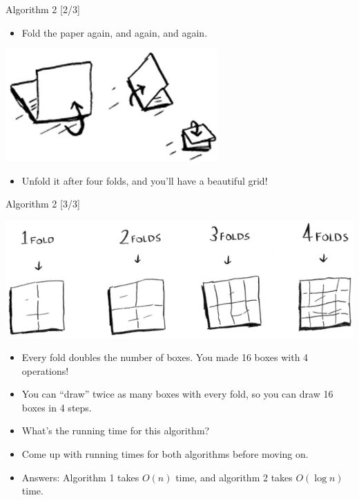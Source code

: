 \documentclass[ignorenonframetext,]{beamer}
\providecommand{\tightlist}{%
  \setlength{\itemsep}{0pt}\setlength{\parskip}{0pt}}
\begin{document}
\begin{frame}{Algorithm 2 {[}2/3{]}}
\protect\hypertarget{algorithm-2-23}{}

\begin{itemize}
\tightlist
\item
  Fold the paper again, and again, and again.
\end{itemize}

\includegraphics{./Chapter01-figure/grid_drawing_04.png}

\begin{itemize}
\tightlist
\item
  Unfold it after four folds, and you'll have a beautiful grid!
\end{itemize}

\end{frame}

\begin{frame}{Algorithm 2 {[}3/3{]}}
\protect\hypertarget{algorithm-2-33}{}

\includegraphics{./Chapter01-figure/grid_drawing_05.png}

\begin{itemize}
\tightlist
\item
  Every fold doubles the number of boxes. You made 16 boxes with 4
  operations!
\item
  You can ``draw'' twice as many boxes with every fold, so you can draw
  16 boxes in 4 steps.
\item
  What's the running time for this algorithm?
\item
  Come up with running times for both algorithms before moving on.
\item
  Answers: Algorithm 1 takes \(O(n)\) time, and algorithm 2 takes
  \(O(\log n)\) time.
\end{itemize}

\end{frame}
\end{document}
